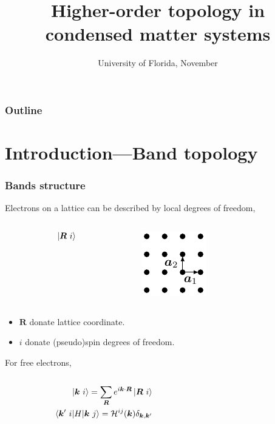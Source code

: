 \documentclass{beamer}
\title{Higher-order topology in condensed matter systems}
\date{University of Florida, November}
\newcommand{\mc}{\mathcal}
\renewcommand{\(}{\left(}
\renewcommand{\)}{\right)}
\renewcommand{\[}{\left[}
\renewcommand{\]}{\right]}
\begin{document}
\frame{\titlepage} 

\begin{frame}
    \frametitle{Outline}

    \tableofcontents
\end{frame}

\section{Introduction---Band topology}
\begin{frame}
    \frametitle{Bands structure}
    Electrons on a lattice can be described by local degrees of freedom, 
    \begin{columns}
        \begin{column}{0.7\textwidth}
            \begin{align*}
                \ket{\bm R \ i} 
            \end{align*}
            \vfill
        \end{column}
        \begin{column}{0.3\textwidth}
            \centering
            \includegraphics[]{square_lattice.pdf}
            \vfill
        \end{column}
    \end{columns}
    \begin{itemize}
        \item $\bm R$ donate lattice coordinate.
        \item $i$ donate (pseudo)spin degrees of freedom.
    \end{itemize} \pause
    For free electrons, 
    \begin{columns}
        \begin{column}{0.7\textwidth}
            \begin{align*}
                \ket{\bm k\  i} = \sum_{\bm R} e^{i\bm k \cdot \bm R} \ket{\bm R \ i} \\
                \mel*{\bm k^\prime \ i}{H}{\bm k \ j} = \mc H^{ij}(\bm k) \delta_{\bm k, \bm k^\prime}
            \end{align*}
            \vfill
        \end{column}
        \begin{column}{0.3\textwidth}

\end{column}
\end{columns}
\end{frame}
\end{document}
